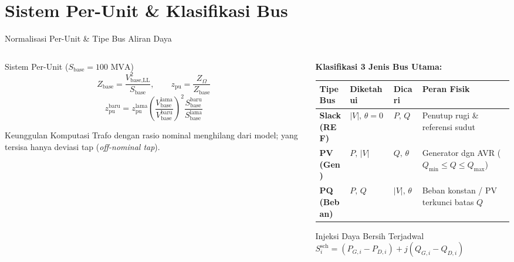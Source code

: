 \documentclass[aspectratio=169,10pt]{beamer}
\begin{document}
\section{Sistem Per-Unit \& Klasifikasi Bus}

\begin{frame}{Normalisasi Per-Unit \& Tipe Bus Aliran Daya}
  \begin{columns}[T]
    \begin{column}{0.46\textwidth}
      \begin{block}{Sistem Per-Unit ($S_{\text{base}} = 100\text{ MVA}$)}
        \[
          Z_{\text{base}} = \frac{V_{\text{base,LL}}^{2}}{S_{\text{base}}},\qquad
          z_{\text{pu}} = \frac{Z_{\Omega}}{Z_{\text{base}}}
        \]
        \[
          z_{\text{pu}}^{\text{baru}} = z_{\text{pu}}^{\text{lama}}\left(\frac{V_{\text{base}}^{\text{lama}}}{V_{\text{base}}^{\text{baru}}}\right)^{2}\frac{S_{\text{base}}^{\text{baru}}}{S_{\text{base}}^{\text{lama}}}
        \]
      \end{block}
      \begin{exampleblock}{Keunggulan Komputasi}
        Trafo dengan rasio nominal menghilang dari model; yang tersisa hanya deviasi tap (\textit{off-nominal tap}).
      \end{exampleblock}
    \end{column}
    \begin{column}{0.52\textwidth}
      \textbf{Klasifikasi 3 Jenis Bus Utama:}
      \vspace{0.15cm}
      \scriptsize
      \begin{tabular}{@{}llll@{}}
        \toprule
        \textbf{Tipe Bus} & \textbf{Diketahui} & \textbf{Dicari} & \textbf{Peran Fisik} \\
        \midrule
        \textbf{Slack (REF)} & $|V|,\,\theta=0$ & $P,\,Q$ & Penutup rugi \& referensi sudut \\
        \textbf{PV (Gen)} & $P,\,|V|$ & $Q,\,\theta$ & Generator dgn AVR ($Q_{\min}\!\le\!Q\!\le\!Q_{\max}$) \\
        \textbf{PQ (Beban)} & $P,\,Q$ & $|V|,\,\theta$ & Beban konstan / PV terkunci batas $Q$ \\
        \bottomrule
      \end{tabular}
      \vspace{0.25cm}
      \normalsize
      \begin{alertblock}{Injeksi Daya Bersih Terjadwal}
        $S_i^{\text{sch}} = (P_{G,i} - P_{D,i}) + j(Q_{G,i} - Q_{D,i})$
      \end{alertblock}
    \end{column}
  \end{columns}
\end{frame}
\end{document}

